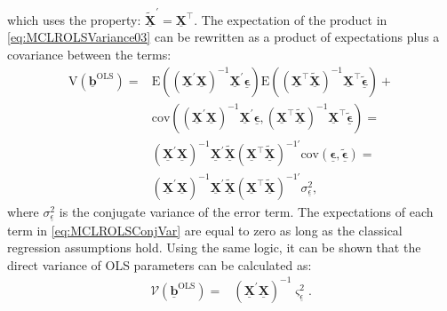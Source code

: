 \documentclass[
]{book}
\begin{document}
which uses the property: \(\tilde{\underline{\mathbf{X}}}^\prime = \underline{\mathbf{X}}^\top\). The expectation of the product in \eqref{eq:MCLROLSVariance03} can be rewritten as a product of expectations plus a covariance between the terms:
\begin{equation}
    \begin{aligned}
        \mathrm{V}\left( \underline{\boldsymbol{b}}^{\text{OLS}} \right) =
        & \mathrm{E}\left( \left( \underline{\mathbf{X}}^\prime \underline{\mathbf{X}} \right)^{-1} \underline{\mathbf{X}}^\prime \underline{\boldsymbol{\epsilon}} \right) \mathrm{E}\left( \left( {\underline{\mathbf{X}}}^\top \tilde{\underline{\mathbf{X}}} \right)^{-1} {\underline{\mathbf{X}}}^\top \tilde{\underline{\boldsymbol{\epsilon}}} \right) + \\
        & \mathrm{cov}\left(\left( \underline{\mathbf{X}}^\prime \underline{\mathbf{X}} \right)^{-1} \underline{\mathbf{X}}^\prime \underline{\boldsymbol{\epsilon}}, \left( {\underline{\mathbf{X}}}^\top \tilde{\underline{\mathbf{X}}} \right)^{-1} {\underline{\mathbf{X}}}^\top \tilde{\underline{\boldsymbol{\epsilon}}} \right) = \\
        & \left( \underline{\mathbf{X}}^\prime \underline{\mathbf{X}} \right)^{-1} \underline{\mathbf{X}}^\prime \tilde{\underline{\mathbf{X}}} \left( {\underline{\mathbf{X}}}^\top \tilde{\underline{\mathbf{X}}} \right)^{-1 \prime}  \mathrm{cov}\left( \underline{\boldsymbol{\epsilon}}, \tilde{\underline{\boldsymbol{\epsilon}}} \right) = \\
        & \left( \underline{\mathbf{X}}^\prime \underline{\mathbf{X}} \right)^{-1} \underline{\mathbf{X}}^\prime \tilde{\underline{\mathbf{X}}} \left( {\underline{\mathbf{X}}}^\top \tilde{\underline{\mathbf{X}}} \right)^{-1 \prime}  \sigma_{\underline{\epsilon}}^2 ,
    \end{aligned}
    \label{eq:MCLROLSConjVar}
\end{equation}
where \(\sigma_{\underline{\epsilon}}^2\) is the conjugate variance of the error term. The expectations of each term in \eqref{eq:MCLROLSConjVar} are equal to zero as long as the classical regression assumptions hold. Using the same logic, it can be shown that the direct variance of OLS parameters can be calculated as:
\begin{equation}
    \begin{aligned}
        \mathcal{V}\left( \underline{\boldsymbol{b}}^{\text{OLS}} \right) =
        & \left( \underline{\mathbf{X}}^\prime \underline{\mathbf{X}} \right)^{-1} \varsigma_{\underline{\epsilon}}^2 .
    \end{aligned}
    \label{eq:MCLROLSDirVar}
\end{equation}
\end{document}
